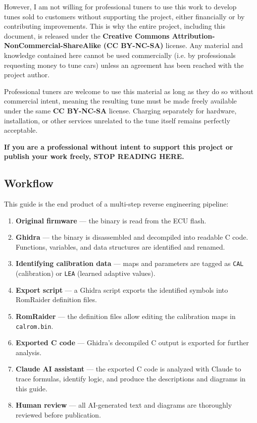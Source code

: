 \documentclass[a4paper,11pt]{article}
\renewcommand{\_}{\oldunderscore\allowbreak}
\begin{document}
However, I am not willing for professional tuners to use this work to develop
tunes sold to customers without supporting the project, either financially or by
contributing improvements. This is why the entire project, including this
document, is released under the
\textbf{Creative Commons Attribution-NonCommercial-ShareAlike (CC BY-NC-SA)}
license. Any material and knowledge contained here cannot be used commercially
(i.e. by professionals requesting money to tune cars) unless an agreement has
been reached with the project author.

Professional tuners are welcome to use this material as long as they do so
without commercial intent, meaning the resulting tune must be made freely
available under the same \textbf{CC BY-NC-SA} license. Charging separately
for hardware, installation, or other services unrelated to the tune itself
remains perfectly acceptable.

\textbf{If you are a professional without intent to support this project or
publish your work freely, STOP READING HERE.}

\subsection{Workflow}

This guide is the end product of a multi-step reverse engineering pipeline:

\begin{enumerate}
	\item \textbf{Original firmware} --- the binary is read from the ECU flash.
	\item \textbf{Ghidra} --- the binary is disassembled and decompiled into
	      readable C code. Functions, variables, and data structures are
	      identified and renamed.
	\item \textbf{Identifying calibration data} --- maps and parameters are
	      tagged as \texttt{CAL\_} (calibration) or \texttt{LEA\_} (learned
	      adaptive values).
	\item \textbf{Export script} --- a Ghidra script exports the identified
	      symbols into RomRaider definition files.
	\item \textbf{RomRaider} --- the definition files allow editing the
	      calibration maps in \texttt{calrom.bin}.
	\item \textbf{Exported C code} --- Ghidra's decompiled C output is
	      exported for further analysis.
	\item \textbf{Claude AI assistant} --- the exported C code is analyzed
	      with Claude to trace formulas, identify logic, and produce the
	      descriptions and diagrams in this guide.
	\item \textbf{Human review} --- all AI-generated text and diagrams are
	      thoroughly reviewed before publication.
\end{enumerate}
\end{document}
